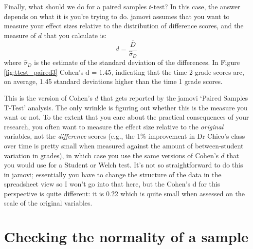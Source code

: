 
Finally, what should we do for a paired samples $t$-test? In this case, the answer depends on what it is you're trying to do. jamovi assumes that you want to measure your effect sizes relative to the distribution of difference scores, and the measure of $d$ that you calculate is: 
$$
d = \frac{\bar{D}}{\hat{\sigma}_D}
$$
where $\hat{\sigma}_D$ is the estimate of the standard deviation of the differences. In Figure \ref{fig:ttest_paired3} Cohen's d = 1.45, indicating that the time 2 grade scores are, on average, 1.45 standard deviations higher than the time 1 grade scores.

This is the version of Cohen's $d$ that gets reported by the jamovi `Paired Samples T-Test' analysis. The only wrinkle is figuring out whether this is the measure you want or not. To the extent that you care about the practical consequences of your research, you often want to measure the effect size relative to the {\it original} variables, not the {\it difference} scores (e.g., the 1\% improvement in Dr Chico's class over time is pretty small when measured against the amount of between-student variation in grades), in which case you use the same versions of Cohen's $d$ that you would use for a Student or Welch test. It's not so straightforward to do this in jamovi; essentially you have to change the structure of the data in the spreadsheet view so I won't go into that here, but the Cohen's d for this perspective is quite different: it is 0.22 which is quite small when assessed on the scale of the original variables.


\section{Checking the normality of a sample\label{sec:shapiro}}

